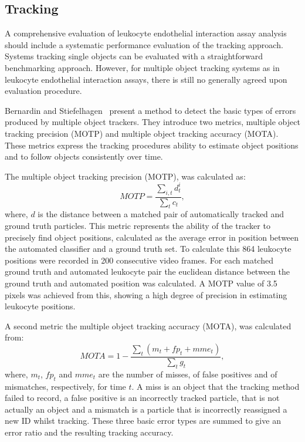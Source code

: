 \subsection{Tracking}
\label{leukocytes:validation:tracking}
A comprehensive evaluation of leukocyte endothelial interaction assay analysis should include a systematic performance evaluation of the tracking approach. Systems tracking single objects can be evaluated with a straightforward benchmarking approach. However, for multiple object tracking systems as in leukocyte endothelial interaction assays, there is still no generally agreed upon evaluation procedure.

Bernardin and Stiefelhagen~\cite{Bernardin2008} present a method to detect the basic types of errors produced by multiple object trackers. They introduce two metrics, multiple object tracking precision (MOTP) and multiple object tracking accuracy (MOTA). These metrics express the tracking procedures ability to estimate object positions and to follow objects consistently over time.

The multiple object tracking precision (MOTP), was calculated as:
\begin{equation}
	MOTP=\frac{\sum_{i,t}d_{t}^{i}}{\sum_{t}c_{t}},
\end{equation}
where, $d$ is the distance between a matched pair of automatically tracked and ground truth particles. This metric represents the ability of the tracker to precisely find object positions, calculated as the average error in position between the automated classifier and a ground truth set. To calculate this 864 leukocyte positions were recorded in 200 consecutive video frames. For each matched ground truth and automated leukocyte pair the euclidean distance between the ground truth and automated position was calculated. A MOTP value of 3.5 pixels was achieved from this, showing a high degree of precision in estimating leukocyte positions.

A second metric the multiple object tracking accuracy (MOTA), was calculated from:
\begin{equation}
	MOTA=1-\frac{\sum_{t}(m_t+fp_t+mme_t)}{\sum_{t}g_{t}},
\end{equation}
where, $m_t$, $fp_t$ and $mme_t$ are the number of misses, of false positives and of mismatches, respectively, for time $t$. A miss is an object that the tracking method failed to record, a false positive is an incorrectly tracked particle, that is not actually an object and a mismatch is a particle that is incorrectly reassigned a new ID whilst tracking. These three basic error types are summed to give an error ratio and the resulting tracking accuracy.

